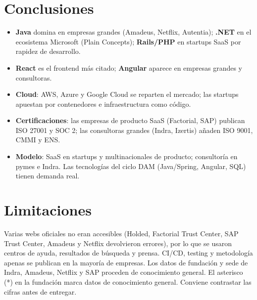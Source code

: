 \documentclass[10.5pt,a4paper]{article}
\begin{document}
\section{Conclusiones}
\begin{itemize}
\item \textbf{Java} domina en empresas grandes (Amadeus, Netflix, Autentia); \textbf{.NET} en el ecosistema Microsoft (Plain Concepts); \textbf{Rails/PHP} en startups SaaS por rapidez de desarrollo.
\item \textbf{React} es el frontend m\'as citado; \textbf{Angular} aparece en empresas grandes y consultoras.
\item \textbf{Cloud}: AWS, Azure y Google Cloud se reparten el mercado; las startups apuestan por contenedores e infraestructura como c\'odigo.
\item \textbf{Certificaciones}: las empresas de producto SaaS (Factorial, SAP) publican ISO 27001 y SOC 2; las consultoras grandes (Indra, Izertis) a\~naden ISO 9001, CMMI y ENS.
\item \textbf{Modelo}: SaaS en startups y multinacionales de producto; consultor\'ia en pymes e Indra. Las tecnolog\'ias del ciclo DAM (Java/Spring, Angular, SQL) tienen demanda real.
\end{itemize}

\section{Limitaciones}
Varias webs oficiales no eran accesibles (Holded, Factorial Trust Center, SAP Trust Center, Amadeus y Netflix devolvieron errores), por lo que se usaron centros de ayuda, resultados de b\'usqueda y prensa. CI/CD, testing y metodolog\'ia apenas se publican en la mayor\'ia de empresas. Los datos de fundaci\'on y sede de Indra, Amadeus, Netflix y SAP proceden de conocimiento general. El asterisco (*) en la fundaci\'on marca datos de conocimiento general. Conviene contrastar las cifras antes de entregar.
\end{document}
